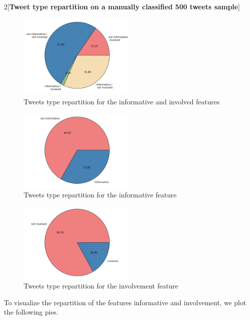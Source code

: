 \documentclass[a4paper,12pt]{report}
\begin{document}
\newpage

\begin{multicols}{2}[\textbf{Tweet type repartition on a manually classified 500 tweets sample}]

\begin{figure}[H]
\centering
\includegraphics[width=0.5\textwidth]{images/plots/pies/pie_pairs.png}
\caption{Tweets type repartition for the informative and involved features}
\label{pieTypeInfInv}
\end{figure}
\begin{figure}[H]
\centering
\includegraphics[width=0.5\textwidth]{images/plots/pies/pie_info.png}
\caption{Tweets type repartition for the informative feature}
\label{pieTypeInf}
\end{figure}
\begin{figure}[H]
\centering
\includegraphics[width=0.5\textwidth]{images/plots/pies/pie_invo.png}
\caption{Tweets type repartition for the involvement feature}
\label{pieTypeInv}
\end{figure}
\vfill
To visualize the repartition of the features informative and involvement, we plot the following pies.\\

\end{multicols}
\end{document}
